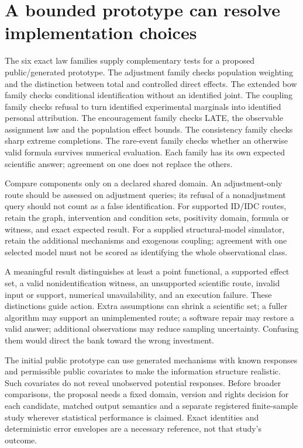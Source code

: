 \section{A bounded prototype can resolve implementation choices}
\label{exec17:s3-design}

The six exact law families supply complementary tests
for a proposed public/generated prototype. The
adjustment family checks population weighting and
the distinction between total and controlled direct
effects. The extended bow family checks conditional
identification without an identified joint. The
coupling family checks refusal to turn identified
experimental marginals into identified personal
attribution. The encouragement family checks LATE,
the observable assignment law and the population
effect bounds. The consistency family checks sharp
extreme completions. The rare-event family checks
whether an otherwise valid formula survives numerical
evaluation. Each family has its own expected scientific
answer; agreement on one does not replace the
others.~\citep{exec17_s3_exact,exec17_s3_decision,exec17_s3_design}

Compare components only on a declared shared domain.
An adjustment-only route should be assessed on
adjustment queries; its refusal of a nonadjustment
query should not count as a false identification.
For supported ID/IDC routes, retain the graph,
intervention and condition sets, positivity domain,
formula or witness, and exact expected result.
For a supplied structural-model simulator, retain
the additional mechanisms and exogenous coupling;
agreement with one selected model must not be scored
as identifying the whole observational class.

A meaningful result distinguishes at least a
point functional, a supported effect set, a valid
nonidentification witness, an unsupported scientific
route, invalid input or support, numerical
unavailability, and an execution failure.
These distinctions guide action. Extra assumptions
can shrink a scientific set; a fuller algorithm may
support an unimplemented route; a software repair
may restore a valid answer; additional observations
may reduce sampling uncertainty. Confusing them
would direct the bank toward the wrong investment.

The initial public prototype can use generated
mechanisms with known responses and permissible
public covariates to make the information
structure realistic. Such covariates do not reveal
unobserved potential responses. Before broader
comparisons, the proposal needs a fixed domain,
version and rights decision for each candidate,
matched output semantics and a separate registered
finite-sample study wherever statistical performance
is claimed. Exact identities and deterministic
error envelopes are a necessary reference, not
that study's outcome.~\citep{exec17_s3_design}

